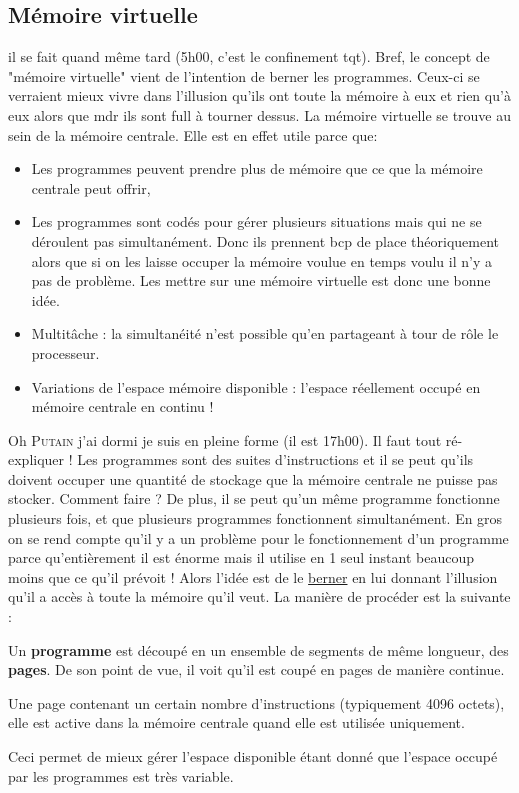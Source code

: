 \documentclass[12pt,a4paper]{report}
\begin{document}
\subsection{Mémoire virtuelle}
il se fait quand même tard (5h00, c'est le confinement tqt). Bref, le concept de "mémoire virtuelle" vient de l'intention de berner les programmes. Ceux-ci se verraient mieux vivre dans l'illusion qu'ils ont toute la mémoire à eux et rien qu'à eux alors que mdr ils sont full à tourner dessus. La mémoire virtuelle se trouve au sein de la mémoire centrale. Elle est en effet utile parce que:
\begin{itemize}
\item Les programmes peuvent prendre plus de mémoire que ce que la mémoire centrale peut offrir,
\item Les programmes sont codés pour gérer plusieurs situations mais qui ne se déroulent pas simultanément. Donc ils prennent bcp de place théoriquement alors que si on les laisse occuper la mémoire voulue en temps voulu il n'y a pas de problème. Les mettre sur une mémoire virtuelle est donc une bonne idée.
\item Multitâche : la simultanéité n'est possible qu'en partageant à tour de rôle le processeur.
\item Variations de l'espace mémoire disponible : l'espace réellement occupé en mémoire centrale en continu !
\end{itemize} 

Oh \textsc{Putain} j'ai dormi je suis en pleine forme (il est 17h00). Il faut tout ré-expliquer ! Les programmes sont des suites d'instructions et il se peut qu'ils doivent occuper une quantité de stockage que la mémoire centrale ne puisse pas stocker. Comment faire ? De plus, il se peut qu'un même programme fonctionne plusieurs fois, et que plusieurs programmes fonctionnent simultanément. En gros on se rend compte qu'il y a un problème pour le fonctionnement d'un programme parce qu'entièrement il est énorme mais il utilise en 1 seul instant beaucoup moins que ce qu'il prévoit ! Alors l'idée est de le \underline{berner} en lui donnant l'illusion qu'il a accès à toute la mémoire qu'il veut. La manière de procéder est la suivante :
\begin{description}[leftmargin = !, labelwidth=\widthof{\bfseries Pagination }]
\item[Pagination] Un \textbf{programme} est découpé en un ensemble de segments de même longueur, des \textbf{pages}. De son point de vue, il voit qu'il est coupé en pages de manière continue. 
\item[$\Rightarrow$] Une page contenant un certain nombre d'instructions (typiquement 4096 octets), elle est active dans la mémoire centrale quand elle est utilisée uniquement.  
\end{description}
Ceci permet de mieux gérer l'espace disponible étant donné que l'espace occupé par les programmes est très variable.
\end{document}
